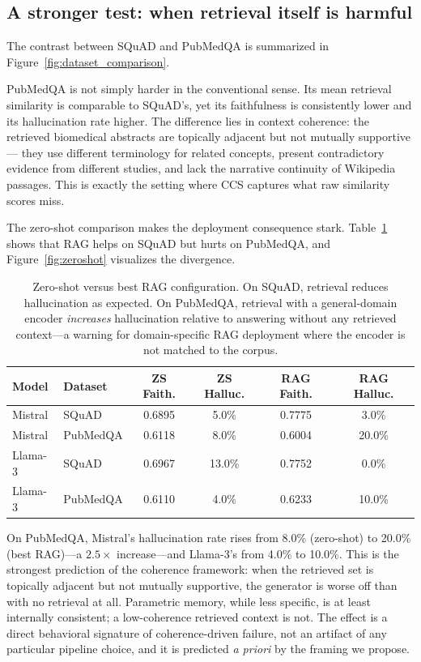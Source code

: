 \subsection{A stronger test: when retrieval itself is harmful}

The contrast between SQuAD and PubMedQA is summarized in
Figure~\ref{fig:dataset_comparison}.

PubMedQA is not simply harder in the conventional sense. Its mean
retrieval similarity is comparable to SQuAD's, yet its faithfulness is
consistently lower and its hallucination rate higher. The difference
lies in context coherence: the retrieved biomedical abstracts are
topically adjacent but not mutually supportive — they use different
terminology for related concepts, present contradictory evidence from
different studies, and lack the narrative continuity of Wikipedia
passages. This is exactly the setting where CCS captures what raw
similarity scores miss.

The zero-shot comparison makes the deployment consequence stark.
Table~\ref{tab:zeroshot} shows that RAG helps on SQuAD but hurts on
PubMedQA, and Figure~\ref{fig:zeroshot} visualizes the divergence.

\begin{table}[!htb]
\centering
\caption{Zero-shot versus best RAG configuration. On SQuAD, retrieval
reduces hallucination as expected. On PubMedQA, retrieval with a
general-domain encoder \emph{increases} hallucination relative to answering
without any retrieved context---a warning for domain-specific RAG
deployment where the encoder is not matched to the corpus.}
\label{tab:zeroshot}
\small
\begin{tabular}{llcccc}
\toprule
Model & Dataset & ZS Faith. & ZS Halluc. & RAG Faith. & RAG Halluc. \\
\midrule
Mistral & SQuAD    & 0.6895 & 5.0\%  & 0.7775 & 3.0\% \\
Mistral & PubMedQA & 0.6118 & 8.0\%  & 0.6004 & 20.0\% \\
Llama-3 & SQuAD    & 0.6967 & 13.0\% & 0.7752 & 0.0\% \\
Llama-3 & PubMedQA & 0.6110 & 4.0\%  & 0.6233 & 10.0\% \\
\bottomrule
\end{tabular}
\end{table}



On PubMedQA, Mistral's hallucination rate rises from 8.0\% (zero-shot) to
20.0\% (best RAG)---a $2.5\times$ increase---and Llama-3's from 4.0\% to
10.0\%. This is the strongest prediction of the coherence framework: when
the retrieved set is topically adjacent but not mutually supportive, the
generator is worse off than with no retrieval at all. Parametric memory,
while less specific, is at least internally consistent; a low-coherence
retrieved context is not. The effect is a direct behavioral signature of
coherence-driven failure, not an artifact of any particular pipeline
choice, and it is predicted \emph{a priori} by the framing we propose.

\FloatBarrier
